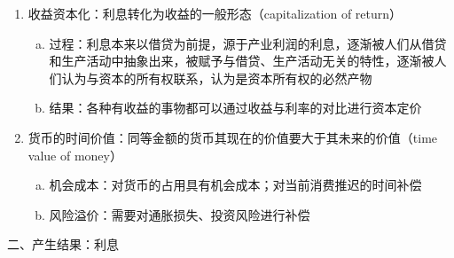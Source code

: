\documentclass[12pt]{book}
\begin{document}
\begin{enumerate}[(1)]
    \item 收益资本化：利息转化为收益的一般形态（capitalization of return）
          \begin{enumerate}[a.]
              \item 过程：利息本来以借贷为前提，源于产业利润的利息，逐渐被人们从借贷和生产活动中抽象出来，被赋予与借贷、生产活动无关的特性，逐渐被人们认为与资本的所有权联系，认为是资本所有权的必然产物
              \item 结果：各种有收益的事物都可以通过收益与利率的对比进行资本定价
          \end{enumerate}
    \item 货币的时间价值：同等金额的货币其现在的价值要大于其未来的价值（time value of money）
          \begin{enumerate}[a.]
              \item 机会成本：对货币的占用具有机会成本；对当前消费推迟的时间补偿
              \item 风险溢价：需要对通胀损失、投资风险进行补偿
          \end{enumerate}
\end{enumerate}


二、产生结果：利息
\end{document}
